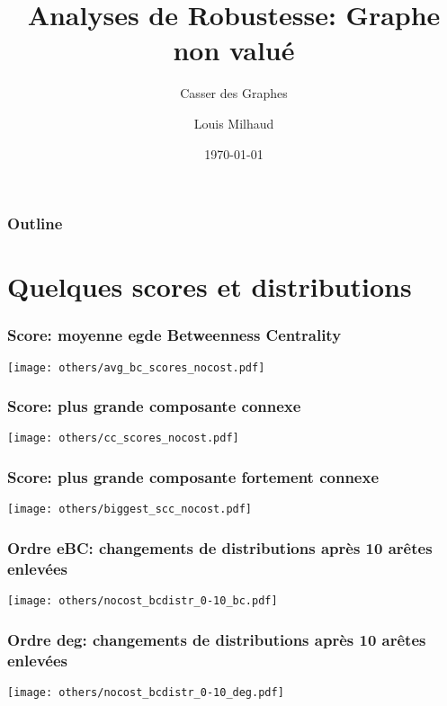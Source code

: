 \documentclass[aspectratio=169]{beamer}
\title{Analyses de Robustesse: Graphe non valué}
\subtitle{Casser des Graphes}
\author{Louis Milhaud}
\institute{Complex Networks - LIP6}
\date{\today}
\begin{document}
    \begin{frame}
        \titlepage
    \end{frame}

    \begin{frame}
        \frametitle{Outline}
        \tableofcontents
    \end{frame}

    \section{Quelques scores et distributions}

    \begin{frame}
        \frametitle{Score: moyenne egde Betweenness Centrality}
        \centering
        \texttt{[image: others/avg\_bc\_scores\_nocost.pdf]}
    \end{frame}

    \begin{frame}
        \frametitle{Score: plus grande composante connexe}
        \centering
        \texttt{[image: others/cc\_scores\_nocost.pdf]}
    \end{frame}

    \begin{frame}
        \frametitle{Score: plus grande composante fortement connexe}
        \centering
        \texttt{[image: others/biggest\_scc\_nocost.pdf]}
    \end{frame}

    \begin{frame}
        \frametitle{Ordre eBC: changements de distributions après 10 arêtes enlevées}
        \centering
        \texttt{[image: others/nocost\_bcdistr\_0-10\_bc.pdf]}    
    \end{frame}

    \begin{frame}
        \frametitle{Ordre deg: changements de distributions après 10 arêtes enlevées}
        \centering
        \texttt{[image: others/nocost\_bcdistr\_0-10\_deg.pdf]}    
    \end{frame}
\end{document}
